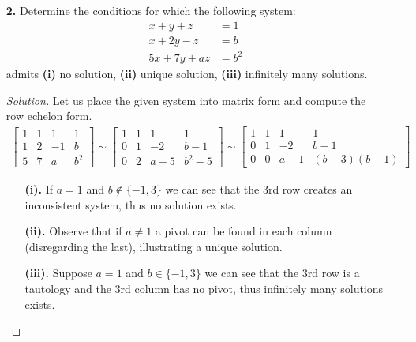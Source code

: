 \documentclass[ 12pt ]{article}
\begin{document}
\begin{enumerate}
	\item[\textbf{2.}] Determine the conditions for which the following system:
		\begin{align*}
			x + y + z &= 1 \\
			x + 2y - z &= b \\
			5x + 7y + az &= b^2
		\end{align*}
		admits \textbf{(i)} no solution, \textbf{(ii)} unique solution, \textbf{(iii)} infinitely many solutions.

	\begin{proof}[Solution]\renewcommand{\qedsymbol}{}
		Let us place the given system into matrix form and compute the row echelon form.
		\begin{align*}
			\begin{bmatrix} 1 & 1 & 1 & 1 \\ 1 & 2 & -1 & b \\ 5 & 7 & a & b^2 \end{bmatrix}
			\sim \begin{bmatrix} 1 & 1 & 1 & 1 \\ 0 & 1 & -2 & b-1 \\ 0 & 2 & a-5 & b^2-5 \end{bmatrix}
			\sim \begin{bmatrix} 1 & 1 & 1 & 1 \\ 0 & 1 & -2 & b-1 \\ 0 & 0 & a-1 & (b-3)(b+1) \end{bmatrix}
		\end{align*}
		\begin{enumerate}
			\item[\textbf{(i).}] If $a=1$ and $b \notin \{-1, 3\}$ we can see that the 3rd row creates an inconsistent system, thus no solution exists.
			\item[\textbf{(ii).}] Observe that if $a \neq 1$ a pivot can be found in each column (disregarding the last), illustrating a unique solution.
			\item[\textbf{(iii).}] Suppose $a=1$ and $b \in \{-1, 3\}$ we can see that the 3rd row is a tautology and the 3rd column has no pivot, thus infinitely many
				solutions exists.
		\end{enumerate}
	\end{proof}



\end{enumerate}
\end{document}
